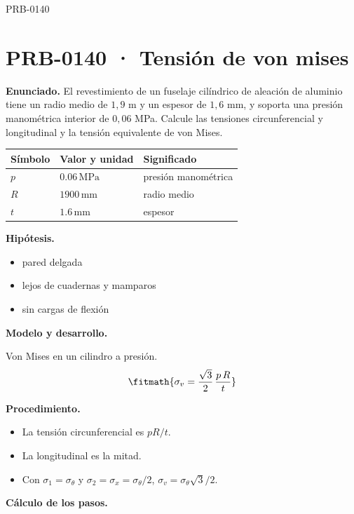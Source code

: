 \begin{studiumworked}{PRB-0140}

\section{PRB-0140 · Tensión de von mises}

\textbf{Enunciado.} El revestimiento de un fuselaje cilíndrico de aleación de aluminio tiene un radio medio de $1{,}9$ m y un espesor de $1{,}6$ mm, y soporta una presión manométrica interior de $0{,}06$ MPa. Calcule las tensiones circunferencial y longitudinal y la tensión equivalente de von Mises.

\par\medskip\noindent\begin{tabular}{@{}p{.18\linewidth}p{.26\linewidth}p{.48\linewidth}@{}}
\toprule Símbolo & Valor y unidad & Significado\\\midrule
$p$ & $0.06\,\mathrm{MPa}$ & presión manométrica\\
$R$ & $1900\,\mathrm{mm}$ & radio medio\\
$t$ & $1.6\,\mathrm{mm}$ & espesor\\
\bottomrule\end{tabular}\par\medskip

\textbf{Hipótesis.}\begin{itemize}\item pared delgada
\item lejos de cuadernas y mamparos
\item sin cargas de flexión\end{itemize}

\textbf{Modelo y desarrollo.}

Von Mises en un cilindro a presión.\[\fitmath{\sigma_v = \frac{\sqrt{3}}{2}\,\frac{p\,R}{t}}\]

\textbf{Procedimiento.}\begin{itemize}\item La tensión circunferencial es $pR/t$.
\item La longitudinal es la mitad.
\item Con $\sigma_1 = \sigma_\theta$ y $\sigma_2 = \sigma_x = \sigma_\theta/2$, $\sigma_v = \sigma_\theta\sqrt{3}/2$.\end{itemize}

\textbf{Cálculo de los pasos.}

\begin{enumerate}


\end{enumerate}
\end{studiumworked}
